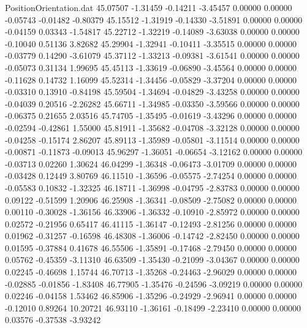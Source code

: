 \begin{filecontents}{PositionOrientation.dat}
  45.07507   -1.31459   -0.14211    -3.45457    0.00000    0.00000   -0.05743   -0.01482   -0.80379
  45.15512   -1.31919   -0.14330    -3.51891    0.00000    0.00000   -0.04159    0.03343   -1.54817
  45.22712   -1.32219   -0.14089    -3.63038    0.00000    0.00000   -0.10040    0.51136    3.82682
  45.29904   -1.32941   -0.10411    -3.35515    0.00000    0.00000   -0.03779    0.14290   -3.61079
  45.37112   -1.33213   -0.09381    -3.61541    0.00000    0.00000   -0.05073    0.31134    1.99695
  45.45113   -1.33619   -0.06890    -3.45564    0.00000    0.00000   -0.11628    0.14732    1.16099
  45.52314   -1.34456   -0.05829    -3.37204    0.00000    0.00000   -0.03310    0.13910   -0.84198
  45.59504   -1.34694   -0.04829    -3.43258    0.00000    0.00000   -0.04039    0.20516   -2.26282
  45.66711   -1.34985   -0.03350    -3.59566    0.00000    0.00000   -0.06375    0.21655    2.03516
  45.74705   -1.35495   -0.01619    -3.43296    0.00000    0.00000   -0.02594   -0.42861    1.55000
  45.81911   -1.35682   -0.04708    -3.32128    0.00000    0.00000   -0.04258   -0.15174    2.86207
  45.89113   -1.35989   -0.05801    -3.11514    0.00000    0.00000   -0.00871   -0.11873   -0.09013
  45.96297   -1.36051   -0.06654    -3.12162    0.00000    0.00000   -0.03713    0.02260    1.30624
  46.04299   -1.36348   -0.06473    -3.01709    0.00000    0.00000   -0.03428    0.12449    3.80769
  46.11510   -1.36596   -0.05575    -2.74254    0.00000    0.00000   -0.05583    0.10832   -1.32325
  46.18711   -1.36998   -0.04795    -2.83783    0.00000    0.00000    0.09122   -0.51599    1.20906
  46.25908   -1.36341   -0.08509    -2.75082    0.00000    0.00000    0.00110   -0.30028   -1.36156
  46.33906   -1.36332   -0.10910    -2.85972    0.00000    0.00000    0.02572   -0.21956    0.65417
  46.41115   -1.36147   -0.12493    -2.81256    0.00000    0.00000    0.01962   -0.31257   -0.16598
  46.48308   -1.36006   -0.14742    -2.82450    0.00000    0.00000    0.01595   -0.37884    0.41678
  46.55506   -1.35891   -0.17468    -2.79450    0.00000    0.00000    0.05762   -0.45359   -3.11310
  46.63509   -1.35430   -0.21099    -3.04367    0.00000    0.00000    0.02245   -0.46698    1.15744
  46.70713   -1.35268   -0.24463    -2.96029    0.00000    0.00000   -0.02885   -0.01856   -1.83408
  46.77905   -1.35476   -0.24596    -3.09219    0.00000    0.00000    0.02246   -0.04158    1.53462
  46.85906   -1.35296   -0.24929    -2.96941    0.00000    0.00000   -0.12010    0.89264   10.20721
  46.93110   -1.36161   -0.18499    -2.23410    0.00000    0.00000    0.03576   -0.37538   -3.93242

\end{filecontents}
